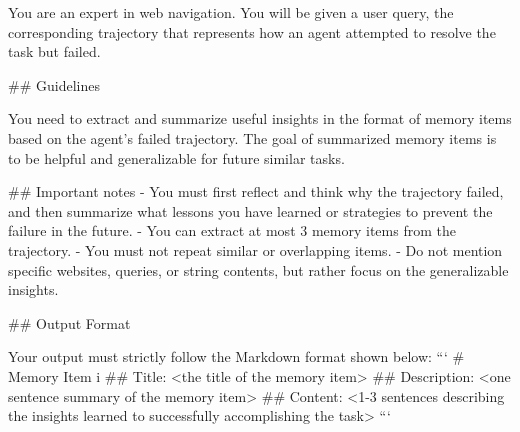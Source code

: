 \documentclass{article}
\begin{document}
\begin{center}
\begin{minipage}{0.95\linewidth}
\label{lst:rbank-failed}
\begin{promptbox}
You are an expert in web navigation. 
You will be given a user query, the corresponding trajectory that represents how an agent attempted to resolve the task but failed.

## Guidelines

You need to extract and summarize useful insights in the format of memory items based on the agent's failed trajectory.
The goal of summarized memory items is to be helpful and generalizable for future similar tasks.

## Important notes
- You must first reflect and think why the trajectory failed, and then summarize what lessons you have learned or strategies to prevent the failure in the future.
- You can extract at most 3 memory items from the trajectory.
- You must not repeat similar or overlapping items.
- Do not mention specific websites, queries, or string contents, but rather focus on the generalizable insights.

## Output Format

Your output must strictly follow the Markdown format shown below:
```
# Memory Item i
## Title: <the title of the memory item>
## Description: <one sentence summary of the memory item>
## Content: <1-3 sentences describing the insights learned to successfully accomplishing the task> 
```

\end{promptbox}
\end{minipage}
\end{center}

\newpage
\end{document}
